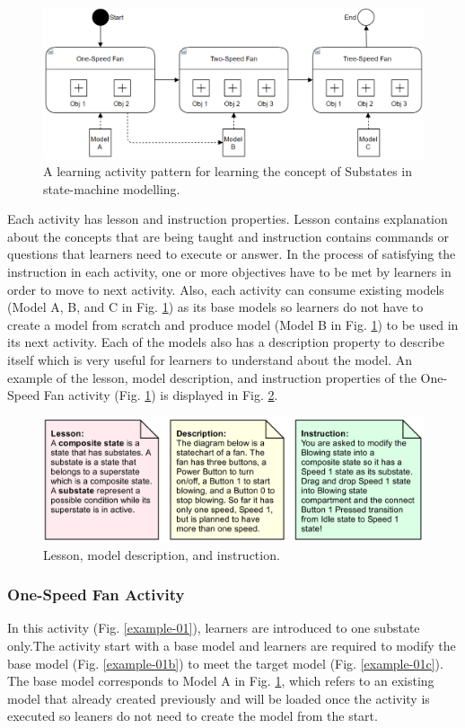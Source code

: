 \documentclass[conference]{IEEEtran}
\begin{document}
\begin{figure}[th]
\centering
\includegraphics[width=\linewidth]{eoml}
\caption{A learning activity pattern for learning the concept of Substates in state-machine modelling.}
\label{eoml}
\end{figure}

Each activity has lesson and instruction properties. Lesson contains explanation about the concepts that are being taught and instruction contains commands or questions that learners need to execute or answer. In the process of satisfying the instruction in each activity, one or more objectives have to be met by learners in order to move to next activity. Also, each activity can consume existing models (Model A, B, and C in Fig. \ref{eoml}) as its base models so learners do not have to create a model from scratch and produce model (Model B in Fig. \ref{eoml}) to be used in its next activity. Each of the models also has a description property to describe itself which is very useful for learners to understand about the model. An example of the lesson, model description, and instruction properties of the One-Speed Fan activity (Fig. \ref{eoml}) is displayed in Fig. \ref{example-01a}.    

\begin{figure}[th]
\centering
\includegraphics[width=\linewidth]{example-01a}
\caption{Lesson, model description, and instruction.}
\label{example-01a}
\end{figure}

\subsubsection{One-Speed Fan Activity}
In this activity (Fig. \ref{example-01}), learners are introduced to one substate only.The activity start with a base model and learners are required to modify the base model (Fig. \ref{example-01b}) to meet the target model (Fig. \ref{example-01c}). The base model corresponds to Model A in Fig. \ref{eoml}, which refers to an existing model that already created previously and will be loaded once the activity is executed so leaners do not need to create the model from the start. 
\end{document}
